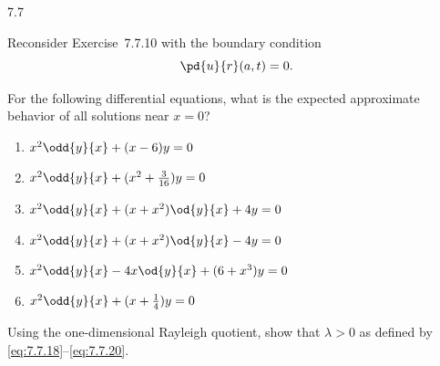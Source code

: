 \begin{exercises}{7.7}
\item Reconsider Exercise~7.7.10 with the boundary condition
\[
\pd{u}{r}(a,t) = 0.
\]

\item For the following differential equations, what is the expected approximate behavior of all solutions near $x = 0$?

\begin{enumerate}
\item[\starred(a)] $x^2\odd{y}{x} + (x-6)y = 0$
\item[(b)] $x^2\odd{y}{x} + (x^2 + \tfrac{3}{16})y = 0$
\item[(c)] $x^2\odd{y}{x} + (x + x^2)\od{y}{x} + 4y = 0$
\item[(d)] $x^2\odd{y}{x} + (x + x^2)\od{y}{x} - 4y = 0$
\item[\starred(e)] $x^2\odd{y}{x} - 4x\od{y}{x} + (6+x^3)y = 0$
\item[(f)] $x^2\odd{y}{x} + (x + \tfrac{1}{4})y = 0$
\end{enumerate}

\item Using the one-dimensional Rayleigh quotient, show that $\lambda > 0$ as defined by \eqref{eq:7.7.18}--\eqref{eq:7.7.20}.

\end{exercises}
